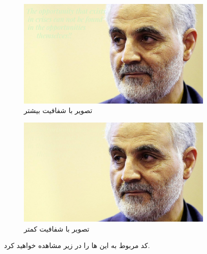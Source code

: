\begin{figure}[h]
    \centering
    \includegraphics[width=0.85\textwidth]{security_images/result_tmp.jpg}
    \caption{تصویر با شفافیت بیشتر
    }
\end{figure}


\begin{figure}[h]
    \centering
    \includegraphics[width=0.85\textwidth]{security_images/result.jpg}
    \caption{تصویر با شفافیت کمتر
    }
\end{figure}

\clearpage

\begin{boxA}
    کد مربوط به این 
    ها را در زیر مشاهده خواهید کرد.
\end{boxA}

\begin{boxE}
    \lr{}
\end{boxE}


